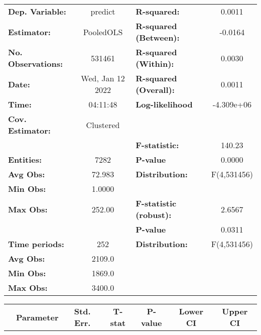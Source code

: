 \begin{center}
\begin{tabular}{lclc}
\toprule
\textbf{Dep. Variable:}    &      predict       & \textbf{  R-squared:         }   &      0.0011      \\
\textbf{Estimator:}        &     PooledOLS      & \textbf{  R-squared (Between):}  &     -0.0164      \\
\textbf{No. Observations:} &       531461       & \textbf{  R-squared (Within):}   &      0.0030      \\
\textbf{Date:}             &  Wed, Jan 12 2022  & \textbf{  R-squared (Overall):}  &      0.0011      \\
\textbf{Time:}             &      04:11:48      & \textbf{  Log-likelihood     }   &    -4.309e+06    \\
\textbf{Cov. Estimator:}   &     Clustered      & \textbf{                     }   &                  \\
\textbf{}                  &                    & \textbf{  F-statistic:       }   &      140.23      \\
\textbf{Entities:}         &        7282        & \textbf{  P-value            }   &      0.0000      \\
\textbf{Avg Obs:}          &       72.983       & \textbf{  Distribution:      }   &   F(4,531456)    \\
\textbf{Min Obs:}          &       1.0000       & \textbf{                     }   &                  \\
\textbf{Max Obs:}          &       252.00       & \textbf{  F-statistic (robust):} &      2.6567      \\
\textbf{}                  &                    & \textbf{  P-value            }   &      0.0311      \\
\textbf{Time periods:}     &        252         & \textbf{  Distribution:      }   &   F(4,531456)    \\
\textbf{Avg Obs:}          &       2109.0       & \textbf{                     }   &                  \\
\textbf{Min Obs:}          &       1869.0       & \textbf{                     }   &                  \\
\textbf{Max Obs:}          &       3400.0       & \textbf{                     }   &                  \\
\bottomrule
\end{tabular}
\begin{tabular}{lcccccc}
                & \textbf{Parameter} & \textbf{Std. Err.} & \textbf{T-stat} & \textbf{P-value} & \textbf{Lower CI} & \textbf{Upper CI}  \\

\end{tabular}
\end{center}
